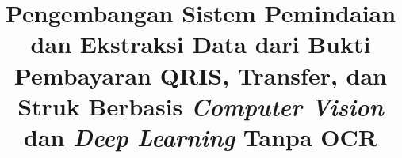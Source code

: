\documentclass[conference,a4paper,english]{IEEEtran}
\begin{document}
\title{Pengembangan Sistem Pemindaian dan Ekstraksi Data dari Bukti Pembayaran QRIS, Transfer, dan Struk Berbasis \emph{Computer Vision} dan \emph{Deep Learning} Tanpa OCR
}



\maketitle











\printbibliography{}
\end{document}
